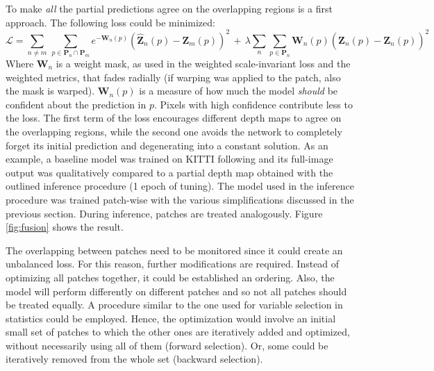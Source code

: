To make \textit{all} the partial predictions agree on the overlapping regions is a first approach.
The following loss could be minimized:
\[
    \mathcal{L} =
        \sum_{n \neq m} \,
        \sum_{p \in \mathbf{P}_{n} \cap \mathbf{P}_{m}}
        e^{-\mathbf{W}_{n}(p)}
        (\hat{\mathbf{Z}}_{n}(p) - \mathbf{Z}_{m}(p))^{2}
        \, + \,
        \lambda
        \sum_{n}
        \sum_{p \in \mathbf{P}_{n}}
        \mathbf{W}_{n}(p)
        (\hat{\mathbf{Z}}_{n}(p) - \mathbf{Z}_{n}(p))^{2}
\]
Where $\mathbf{W}_{n}$ is a weight mask, as used in the weighted scale-invariant loss and the weighted metrics, that fades radially (if warping was applied to the patch, also the mask is warped).
$\mathbf{W}_{n}(p)$ is a measure of how much the model \textit{should} be confident about the prediction in $p$.
Pixels with high confidence contribute less to the loss.
The first term of the loss encourages different depth maps to agree on the overlapping regions, while the second one avoids the network to completely forget its initial prediction and degenerating into a constant solution. 
As an example, a baseline model was trained on KITTI following \cite{Eigen} and its full-image output was qualitatively compared to a partial depth map obtained with the outlined inference procedure (1 epoch of tuning).
The model used in the inference procedure was trained patch-wise with the various simplifications discussed in the previous section.
During inference, patches are treated analogously.
Figure \ref{fig:fusion} shows the result.

\vspace{0.5cm}

The overlapping between patches need to be monitored since it could create an unbalanced loss.
For this reason, further modifications are required.
Instead of optimizing all patches together, it could be established an ordering.
Also, the model will perform differently on different patches and so not all patches should be treated equally.
A procedure similar to the one used for variable selection in statistics could be employed.
Hence, the optimization would involve an initial small set of patches to which the other ones are iteratively added and optimized, without necessarily using all of them (forward selection).
Or, some could be iteratively removed from the whole set (backward selection).

